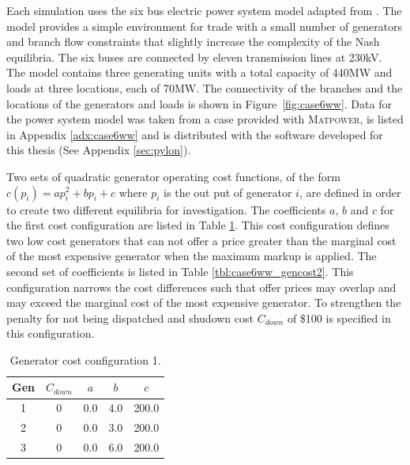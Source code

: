 Each simulation uses the six bus electric power system model adapted from
.  The model provides a simple
environment for trade with a small number of generators and branch flow
constraints that slightly increase the complexity of the Nash equilibria.  The
six buses are connected by eleven transmission lines at 230kV. The model
contains three generating units with a total capacity of 440MW and loads at
three locations, each of 70MW. The connectivity of the branches and the
locations of the generators and loads is shown in Figure~\ref{fig:case6ww}.
Data for the power system model was taken from a case provided with
\textsc{Matpower}, is listed in Appendix \ref{adx:case6ww} and is distributed
with the software developed for this thesis (See Appendix \ref{sec:pylon}).

Two sets of quadratic generator operating cost functions, of the form
$c(p_i)=ap_i^2+bp_i+c$ where $p_i$ is the out put of generator $i$, are defined
in order to create two different equilibria for investigation.  The coefficients
$a$, $b$ and $c$ for the first cost configuration are listed in Table
\ref{tbl:case6ww_gencost1}. This cost configuration defines two low cost
generators that can not offer a price greater than the marginal cost of the most
expensive generator when the maximum markup is applied.  The second set of
coefficients is listed in Table \ref{tbl:case6ww_gencost2}.  This configuration
narrows the cost differences such that offer prices may overlap and may exceed
the marginal cost of the most expensive generator.  To strengthen the penalty
for not being dispatched and shudown cost $C_{down}$ of \$100 is specified in
this configuration.


\begin{table}
\begin{center}
\begin{tabular}{c|c|c|c|c}
\hline
Gen &$C_{down}$ &$a$ &$b$ &$c$ \\
\hline\hline
 1 &0 &0.0 &4.0 &200.0 \\
 2 &0 &0.0 &3.0 &200.0 \\
 3 &0 &0.0 &6.0 &200.0 \\
\hline
\end{tabular}
\caption{Generator cost configuration 1.}
\label{tbl:case6ww_gencost1}
\end{center}
\end{table}

